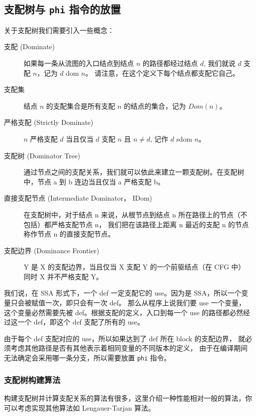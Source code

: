 \subsection{支配树与 \texttt{phi} 指令的放置}

关于支配树我们需要引入一些概念：

\begin{description}
    \item[支配 (Dominate)]
    如果每一条从流图的入口结点到结点 $n$ 的路径都经过结点 $d$, 我们就说 $d$ 支配 $n$，记为 $d$ dom $n$。
    请注意，在这个定义下每个结点都支配它自己。
    \item[支配集]
    结点 $n$ 的支配集合是所有支配 $n$ 的结点的集合，记为 $\mathit{Dom}(n)$。
    \item[严格支配 (Strictly Dominate)]
    $n$ 严格支配 $d$ 当且仅当 $d$ 支配 $n$ 且 $n\neq d$, 记作 $d$ sdom $n$。
       
    \item[支配树 (Dominator Tree)]
    通过节点之间的支配关系，我们就可以依此来建立一颗支配树。在支配树中，节点 a 到 b 连边当且仅当 a 严格支配 b。

    \item[直接支配节点 (Intermediate Dominator， IDom)]
    在支配树中，对于结点 n 来说，从根节点到结点 n 所在路径上的节点（不包括）都严格支配节点 n，
    我们把在该路径上距离 n 最近的支配 n 的节点称作节点 n 的直接支配节点。
    \item[支配边界 (Dominance Frontier)]
    Y 是 X 的支配边界，当且仅当 X 支配 Y 的一个前驱结点（在 CFG 中）
    同时 X 并不严格支配 Y。
\end{description}

我们说，在 SSA 形式下，一个 def 一定支配它的 use。因为是 SSA，所以一个变量只会被赋值一次，即只会有一次 def。
那么从程序上说我们要 use 一个变量，这个变量必然需要先被 def。根据支配的定义，入口到每一个
use 的路径都必然经过这一个 def，即这个 def 支配了所有的 use。

由于每个 def 支配对应的 use，所以如果达到了 def 所在 block 的支配边界，
就必须考虑其他路径是否有其他表示着相同变量的不同版本的定义，
由于在编译期间无法确定会采用哪一条分支，所以需要放置 \texttt{phi} 指令。

\subsubsection{支配树构建算法}

构建支配树并计算支配关系的算法有很多，这里介绍一种性能相对一般的算法，你可以考虑实现其他算法如 Lengauer-Tarjan
算法。

